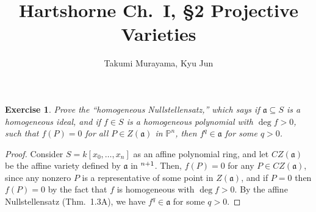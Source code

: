 \documentclass[12pt,letterpaper]{article}
\title{Hartshorne Ch.~I, \S2 Projective Varieties}
\author{Takumi Murayama, Kyu Jun}
\newtheorem{problem}{Exercise}[section]
\theoremstyle{definition}
\theoremstyle{remark}
\numberwithin{equation}{section}
\numberwithin{figure}{problem}
\let\AA\relax
\DeclareMathOperator{\AA}{\mathbb{A}}
\newcommand{\PP}{\mathbb{P}}
\begin{document}
\maketitle
\setcounter{section}{2}
\begin{problem}\label{exc:2.1}
  Prove the ``homogeneous Nullstellensatz,'' which says if $\mathfrak{a}
  \subseteq S$ is a homogeneous ideal, and if $f \in S$ is a homogeneous
  polynomial with $\deg f > 0$, such that $f(P) = 0$ for all $P \in
  Z(\mathfrak{a})$ in $\PP^n$, then $f^q \in \mathfrak{a}$ for some $q >
  0$.
\end{problem}
\begin{proof}
  Consider $S = k[x_0,\ldots,x_n]$ as an affine polynomial ring, and let
  $CZ(\mathfrak{a})$ be the affine variety defined by $\mathfrak{a}$ in
  $\AA^{n+1}$.
  Then, $f(P) = 0$ for any $P \in CZ(\mathfrak{a})$, since any nonzero $P$ is a
  representative of some point in $Z(\mathfrak{a})$, and if $P=0$ then $f(P) =
  0$ by the fact that $f$ is homogeneous with $\deg f > 0$.
  By the affine Nullstellensatz (Thm.~1.3A), we have $f^q \in \mathfrak{a}$ for
  some $q > 0$.
\end{proof}
\end{document}
